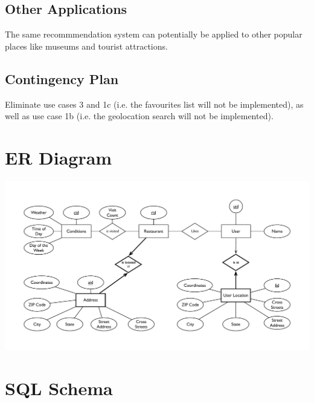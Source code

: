 \documentclass[10pt]{article}
\begin{document}
\subsection*{Other Applications}
The same recommmendation system can potentially be applied to other popular places like museums and tourist attractions.

\subsection*{Contingency Plan}
Eliminate use cases 3 and 1c (i.e. the favourites list will not be implemented), as well as use case 1b (i.e. the geolocation search will not be implemented).

\pagebreak

\section*{ER Diagram}

\includegraphics[angle=90,scale=0.7]{ER_diagram_simplified.pdf}

\section*{SQL Schema}
\end{document}
